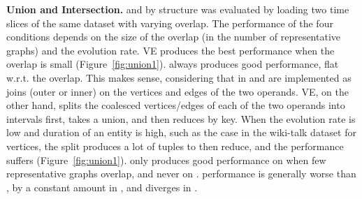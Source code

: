 {\bf Union and Intersection.}   and 
by structure was evaluated by loading two time slices of the same
dataset with varying overlap.  The performance of the four conditions
depends on the size of the overlap (in the number of representative
graphs) and the evolution rate.  VE produces the best performance
when the overlap is small (Figure~\ref{fig:union1}).  \og always produces good performance, flat
w.r.t. the overlap.  This makes sense, considering that in \og
{} and  are implemented as joins (outer
or inner) on the vertices and edges of the two operands.  VE, on the
other hand, splits the coalesced vertices/edges of each of the two
operands into intervals first, takes a union, and then reduces by key.
When the evolution rate is low and duration of an entity is high, such
as the case in the wiki-talk dataset for vertices, the split produces a
lot of tuples to then reduce, and the performance suffers
(Figure~\ref{fig:union1}). \sg only produces good performance on
 when few representative graphs overlap, and never
on . \hg performance is generally worse than \og, by a
constant amount in , and diverges in
.

